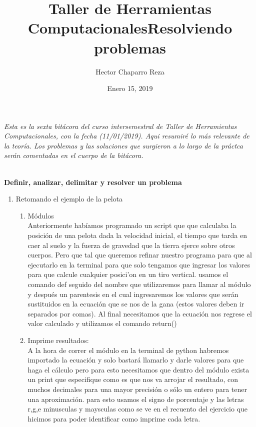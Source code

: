 \documentclass[letterpaper, 12pt, oneside]{article}
\title{\Huge{Taller de Herramientas Computacionales}}
\author{Hector Chaparro Reza}
\date{Enero 15, 2019}
\begin{document}
	\maketitle
	\it Esta es la sexta bit\'acora del curso intersemestral de Taller de Herramientas Computacionales, con la fecha (11/01/2019). Aqui resumir\'e lo m\'as relevante de la teor\'ia. Los problemas y las soluciones que surgieron a lo largo de la pr\'actca ser\'an comentadas en el cuerpo de la bit\'acora.\\
	\newpage
	
	
	\title{\Huge{Resolviendo problemas}}\\
	
	\textbf{Definir, analizar, delimitar y resolver un problema}\\
	
	\begin{enumerate}
		\item {Retomando el ejemplo de la pelota}
		\begin{enumerate}
			\item M\'odulos\\
			Anteriormente hab\'iamos programado un script que que calculaba la posici\'on de una pelota dada la velocidad inicial, el tiempo que tarda en caer al suelo y la fuerza de gravedad que la tierra ejerce sobre otros cuerpos. Pero que tal que queremos refinar nuestro programa para que al ejecutarlo en la terminal para que solo tengamos que ingresar los valores para que calcule cualquier posici'on en un tiro vertical. usamos el comando def seguido del nombre que utilizaremos para llamar al m\'odulo y despu\'es un parentesis en el cual ingresaremos los valores que ser\'an sustituidos en la ecuaci\'on que se nos de la gana (estos valores deben ir separados por comas). Al final necesitamos que la ecuaci\'on nos regrese el valor calculado y utilizamos el comando return()\\
			
			\item Imprime resultados:\\
			A la hora de correr el m\'odulo en la terminal de python habremos importado la ecuaci\'on y solo bastar\'a llamarlo y darle valores para que haga el c\'alculo pero para esto necesitamos que dentro del m\'odulo exista un print que especifique como es que nos va arrojar el resultado, con muchos decimales para una mayor precisi\'on o s\'olo un entero para tener una aproximaci\'on. para esto usamos el signo de porcentaje y las letras r,g,e minusculas y maysculas como se ve en el recuento del ejercicio que hicimos para poder identificar como imprime cada letra. \\
			

\end{enumerate}
\end{enumerate}
\end{document}
